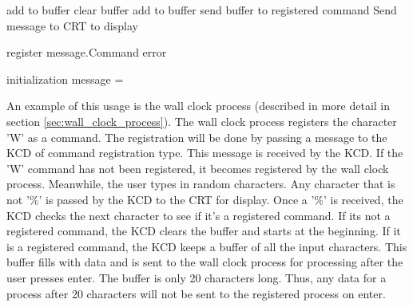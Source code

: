 \documentclass[12pt,twocolumn]{report}
\begin{document}
\begin{algorithmic}
                \State add to buffer
            \Else
                \State clear buffer
            \EndIf
            \State add to buffer
            \State send buffer to registered command
        \EndIf
        \State Send message to CRT to display

    \EndFunction

    \bigskip

            \State register message.Command
        \Else
            \State error
        \EndIf
    \EndFunction

    \bigskip

        \State initialization
            \State message = 
                \State {}
                \State {}
            \EndIf
        \EndWhile
    \EndFunction
\end{algorithmic}

An example of this usage is the wall clock process (described in more detail in section \ref{sec:wall_clock_process}). The wall clock process registers the character 'W' as a command. The registration will be done by passing a message to the KCD of command registration type. This message is received by the KCD. If the 'W' command has not been registered, it becomes registered by the wall clock process. Meanwhile, the user types in random characters. Any character that is not '\%' is passed by the KCD to the CRT for display. Once a '\%' is received, the KCD checks the next character to see if it's a registered command. If its not a registered command, the KCD clears the buffer and starts at the beginning. If it is a registered command, the KCD keeps a buffer of all the input characters. This buffer fills with data and is sent to the wall clock process for processing after the user presses enter. The buffer is only 20 characters long. Thus, any data for a process after 20 characters will not be sent to the registered process on enter.
\end{document}
